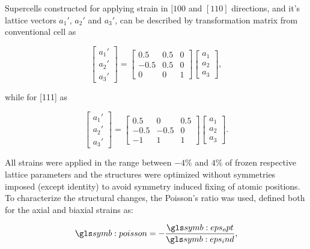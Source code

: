 Supercells constructed for applying strain in $[100$ and $[110]$ directions, and it's lattice vectors $a_1'$, $a_2'$ and $a_3'$, can be described by transformation matrix from conventional cell as

\begin{equation}
\label{Eq:trans_100}
\begin{bmatrix}
a_1' \\ a_2' \\ a_3'
\end{bmatrix}=
\begin{bmatrix}
0.5 & 0.5 & 0 \\
-0.5 & 0.5 & 0 \\
0 & 0 & 1
\end{bmatrix}
\begin{bmatrix}
a_1 \\ a_2 \\ a_3
\end{bmatrix},
\end{equation}

while for [111] as

\begin{equation}
\label{Eq:trans_111}
\begin{bmatrix}
a_1' \\ a_2' \\ a_3'
\end{bmatrix}=
\begin{bmatrix}
0.5 & 0 & 0.5 \\
-0.5 & -0.5 & 0 \\
-1 & 1 & 1
\end{bmatrix}
\begin{bmatrix}
a_1 \\ a_2 \\ a_3
\end{bmatrix}.
\end{equation}

All strains were applied in the range between $-4\%$ and $4\%$ of frozen respective lattice parameters and the structures were optimized without symmetries imposed (except identity) to avoid symmetry induced fixing of atomic positions.
To characterize the structural changes, the Poisson's ratio was used, defined both for the axial and biaxial strains as:

\begin{equation}
\label{Eq:poisson}
\poisson=-\frac{\epsopt}{\epsind},
\end{equation}

